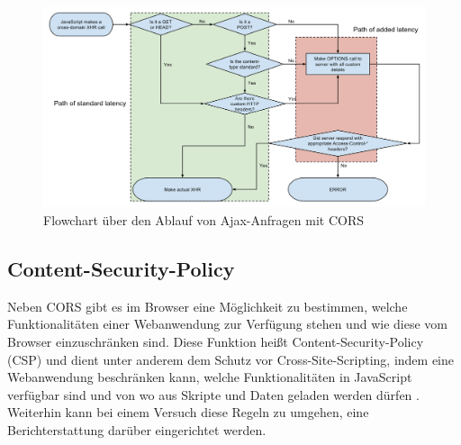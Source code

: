 \begin{figure}[H]
	\centering
	\includegraphics[width=\linewidth]{img/02_theorie/1280px-Flowchart_showing_Simple_and_Preflight_XHR.svg.png}
	\caption{Flowchart über den Ablauf von Ajax-Anfragen mit CORS \cite{FlowchartCORS}}
	\label{fig:cors-workflow}
\end{figure}

\subsection{Content-Security-Policy}


Neben CORS gibt es im Browser eine Möglichkeit zu bestimmen, welche Funktionalitäten einer Webanwendung zur Verfügung stehen und wie diese vom Browser einzuschränken sind. Diese Funktion heißt Content-Security-Policy (CSP) und dient unter anderem dem Schutz vor Cross-Site-Scripting, indem eine Webanwendung beschränken kann, welche Funktionalitäten in JavaScript verfügbar sind und von wo aus Skripte und Daten geladen werden dürfen \cite{MDNContentSecurityPolicy}. Weiterhin kann bei einem Versuch diese Regeln zu umgehen, eine Berichterstattung darüber eingerichtet werden.